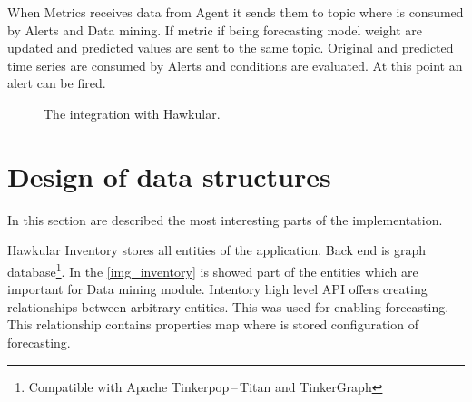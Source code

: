     When Metrics receives data from Agent it sends them to topic where is consumed by Alerts
    and Data mining. If metric if being forecasting model weight are updated and predicted
    values are sent to the same topic. Original and predicted time series are consumed by 
    Alerts and conditions are evaluated. At this point an alert can be fired. 

    \begin{figure}[H]
        \begin{center}
            \caption{The integration with Hawkular.}
            \label{img_integration}
        \end{center}
    \end{figure}

    \section{Design of data structures}
    In this section are described the most interesting parts of the implementation.
    
    Hawkular Inventory stores all entities of the application. Back end is graph
    database\footnote{Compatible with Apache Tinkerpop\,--\,Titan and TinkerGraph}.
    In the \ref{img_inventory} is showed part of the entities which are important for 
    Data mining module.
    Intentory high level API offers creating relationships between arbitrary entities. 
    This was used for enabling forecasting. This relationship contains properties map
    where is stored configuration of forecasting.

